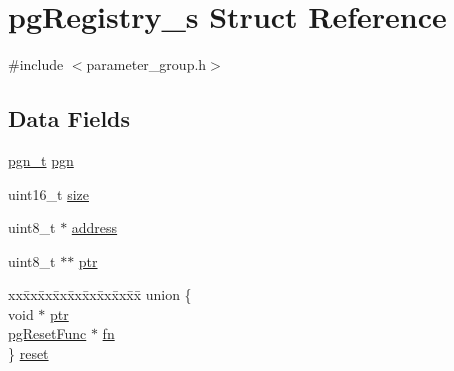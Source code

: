\hypertarget{structpgRegistry__s}{\section{pg\+Registry\+\_\+s Struct Reference}
\label{structpgRegistry__s}
}


{\ttfamily \#include $<$parameter\+\_\+group.\+h$>$}

\subsection*{Data Fields}
\begin{DoxyCompactItemize}
\item 
\hyperlink{parameter__group_8h_ae7ed3d45ee3ac53fa92a8df996ff5f97}{pgn\+\_\+t} \hyperlink{structpgRegistry__s_ac593b9ee19e52f3887613bd1d65ff210}{pgn}
\item 
uint16\+\_\+t \hyperlink{structpgRegistry__s_a2d0173dec2b43af8fcbd88d80ebaaf6f}{size}
\item 
uint8\+\_\+t $\ast$ \hyperlink{structpgRegistry__s_aa103f7d481526cb5a8e6f99992dbe54b}{address}
\item 
uint8\+\_\+t $\ast$$\ast$ \hyperlink{structpgRegistry__s_ae5cd621724c589d926541b9f8171b89f}{ptr}
\item 
\begin{tabbing}
xx\=xx\=xx\=xx\=xx\=xx\=xx\=xx\=xx\=\kill
union \{\\
\>void $\ast$ \hyperlink{structpgRegistry__s_aef98b73265a49dc95546afdce8682ab5}{ptr}\\
\>\hyperlink{parameter__group_8h_a41b7d25b5f2498fa8880ae4c3aa4c208}{pgResetFunc} $\ast$ \hyperlink{structpgRegistry__s_a625a40ff8924eb0a35fe37be90acb047}{fn}\\
\} \hyperlink{structpgRegistry__s_afa6fbee2a6616d202fdce647ea4fd029}{reset}\\

\end{tabbing}\end{DoxyCompactItemize}


